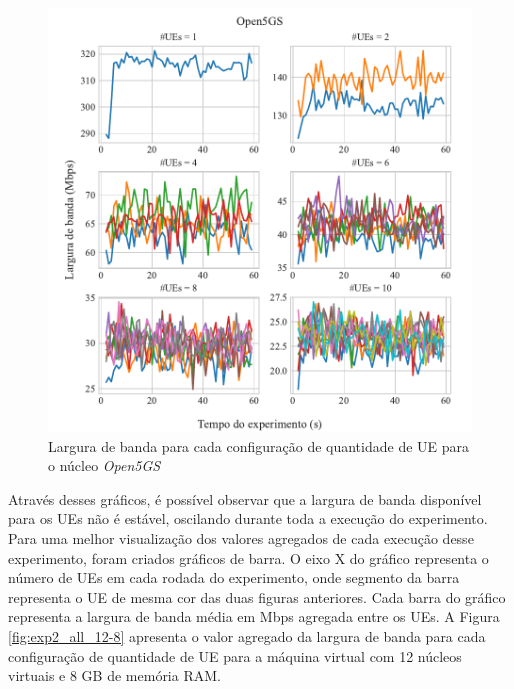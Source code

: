 \begin{figure}[H]
    \centering
    \includegraphics[width=1\textwidth]{TG2/Chapters/DataAnalysis/Figures/EXP2-Open5GS-12C-8GB.pdf}
    \caption{Largura de banda para cada configuração de quantidade de UE para o núcleo \textit{Open5GS}}
    \label{fig:exp2_open5gs_12-8}
\end{figure}

Através desses gráficos, é possível observar que a largura de banda disponível para os UEs não é estável, oscilando durante toda a execução do experimento.
Para uma melhor visualização dos valores agregados de cada execução desse experimento, foram criados gráficos de barra.
O eixo X do gráfico representa o número de UEs em cada rodada do experimento, onde segmento da barra representa o UE de mesma cor das duas figuras anteriores.
Cada barra do gráfico representa a largura de banda média em Mbps agregada entre os UEs.
A Figura \ref{fig:exp2_all_12-8} apresenta o valor agregado da largura de banda para cada configuração de quantidade de UE para a máquina virtual com 12 núcleos virtuais e 8 GB de memória RAM.

